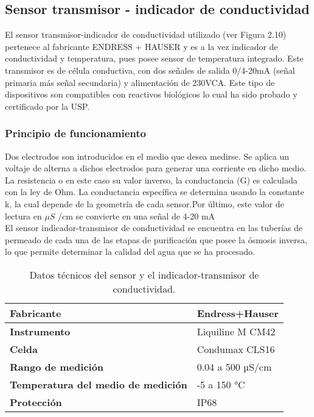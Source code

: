 \subsection{Sensor transmisor - indicador de conductividad}
El sensor transmisor-indicador de conductividad utilizado (ver Figura 2.10)
pertenece al fabricante ENDRESS + HAUSER y es a la vez indicador de
conductividad y temperatura, pues posee sensor de temperatura integrado. Este
transmisor es de célula conductiva, con dos señales de salida 0/4-20mA (señal
primaria más señal secundaria) y alimentación de 230VCA. Este tipo de
dispositivos son compatibles con reactivos biológicos lo cual ha sido probado y
certificado por la USP.\\

\subsubsection*{Principio de funcionamiento}
Dos electrodos son introducidos en el medio que desea medirse. Se aplica
un voltaje de alterna a dichos electrodos para generar una corriente en dicho
medio. La resistencia o en este caso su valor inverso, la conductancia (G) es
calculada con la ley de Ohm. La conductancia específica se determina usando
la constante k, la cual depende de la geometría de cada sensor.Por último, este
valor de lectura en $\mu S$ /cm se convierte en una señal de 4-20 mA\\

El sensor indicador-transmisor de conductividad se encuentra en las
tuberías de permeado de cada una de las etapas de purificación que posee la
ósmosis inversa, lo que permite determinar la calidad del agua que se ha
procesado.




\renewcommand{\arraystretch}{2}
\begin{table}[H]
    \centering
    \caption{Datos técnicos del sensor y el indicador-transmisor de conductividad.}
    \label{table:sensor_conductividad}
    \begin{tabular}{| L{5cm} | L{5cm} |}
        \hline
        \textbf{Fabricante} & Endress+Hauser  \\
        \hline
        \textbf{Instrumento} & Liquiline M CM42  \\
        \hline
        \textbf{Celda} & Condumax CLS16  \\
        \hline
        \textbf{Rango de medición} & 0.04 a 500 µS/cm \\
        \hline
        \textbf{Temperatura del medio de medición} & -5 a 150 °C  \\
        \hline
        \textbf{Protección} & IP68  \\
        \hline
    \end{tabular}
\end{table}
